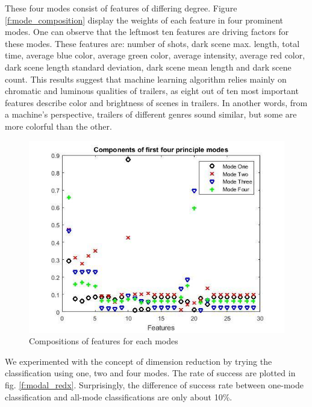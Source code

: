 \documentclass[letterpaper, 10 pt, conference]{ieeeconf}  %
\begin{document}
These four modes consist of features of differing degree. Figure \ref{f:mode_composition} display the weights of each feature in four prominent modes. One can observe that the leftmost ten features are driving factors for these modes. These features are: number of shots, dark scene max. length, total time, average blue color, average green color, average intensity, average red color, dark scene length standard deviation, dark scene mean length and dark scene count. This results suggest that machine learning algorithm relies mainly on chromatic and luminous qualities of trailers, as eight out of ten most important features describe color and brightness of scenes in trailers. In another words, from a machine's perspective, trailers of different genres sound similar, but some are more colorful than the other.
\begin{figure}[h]
	\centering
	\includegraphics[width=\columnwidth]{mode_comp.jpg}
	\caption{Compositions of features for each modes}
	\label{f:mode_covar}
\end{figure}
We experimented with the concept of dimension reduction by trying the classification using one, two and four modes. The rate of success are plotted in fig. \ref{f:modal_redx}. Surprisingly, the difference of success rate between one-mode classification and all-mode classifications are only about 10\%.
\onecolumn
\end{document}
